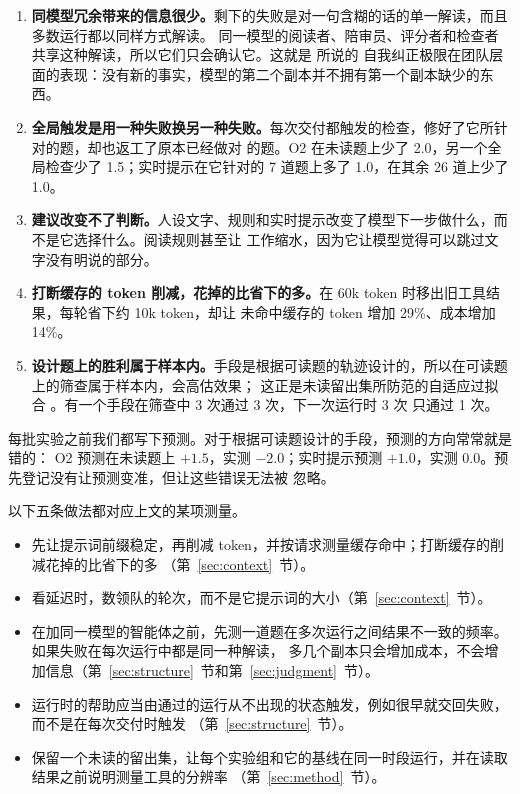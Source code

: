 \begin{enumerate}[leftmargin=1.6em]
  \item \textbf{同模型冗余带来的信息很少。}剩下的失败是对一句含糊的话的单一解读，而且多数运行都以同样方式解读。
    同一模型的阅读者、陪审员、评分者和检查者共享这种解读，所以它们只会确认它。这就是 \citet{huang2024cannot} 所说的
    自我纠正极限在团队层面的表现：没有新的事实，模型的第二个副本并不拥有第一个副本缺少的东西。
  \item \textbf{全局触发是用一种失败换另一种失败。}每次交付都触发的检查，修好了它所针对的题，却也返工了原本已经做对
    的题。O2 在未读题上少了 2.0，另一个全局检查少了 1.5；实时提示在它针对的 7 道题上多了 1.0，在其余 26 道上少了 1.0。
  \item \textbf{建议改变不了判断。}人设文字、规则和实时提示改变了模型下一步做什么，而不是它选择什么。阅读规则甚至让
    工作缩水，因为它让模型觉得可以跳过文字没有明说的部分。
  \item \textbf{打断缓存的 token 削减，花掉的比省下的多。}在 60k token 时移出旧工具结果，每轮省下约 10k token，却让
    未命中缓存的 token 增加 29\%、成本增加 14\%。
  \item \textbf{设计题上的胜利属于样本内。}手段是根据可读题的轨迹设计的，所以在可读题上的筛查属于样本内，会高估效果；
    这正是未读留出集所防范的自适应过拟合 \citep{dwork2015reusable}。有一个手段在筛查中 3 次通过 3 次，下一次运行时 3 次
    只通过 1 次。
\end{enumerate}

每批实验之前我们都写下预测。对于根据可读题设计的手段，预测的方向常常就是错的：
O2 预测在未读题上 $+1.5$，实测 $-2.0$；实时提示预测 $+1.0$，实测 $0.0$。预先登记没有让预测变准，但让这些错误无法被
忽略。

以下五条做法都对应上文的某项测量。
\begin{itemize}[leftmargin=1.4em]
  \item 先让提示词前缀稳定，再削减 token，并按请求测量缓存命中；打断缓存的削减花掉的比省下的多
    （第~\ref{sec:context}~节）。
  \item 看延迟时，数领队的轮次，而不是它提示词的大小（第~\ref{sec:context}~节）。
  \item 在加同一模型的智能体之前，先测一道题在多次运行之间结果不一致的频率。如果失败在每次运行中都是同一种解读，
    多几个副本只会增加成本，不会增加信息（第~\ref{sec:structure}~节和第~\ref{sec:judgment}~节）。
  \item 运行时的帮助应当由通过的运行从不出现的状态触发，例如很早就交回失败，而不是在每次交付时触发
    （第~\ref{sec:structure}~节）。
  \item 保留一个未读的留出集，让每个实验组和它的基线在同一时段运行，并在读取结果之前说明测量工具的分辨率
    （第~\ref{sec:method}~节）。
\end{itemize}
